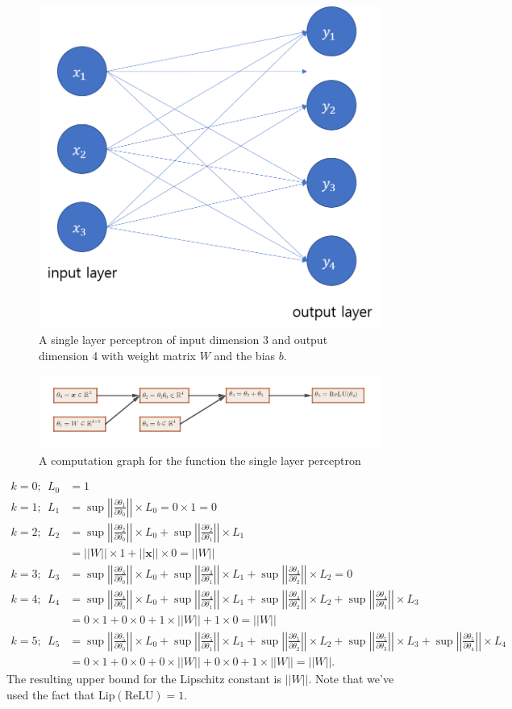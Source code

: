 \documentclass[12pt]{report}
\numberwithin{figure}{chapter}
\theoremstyle{plain}
\theoremstyle{definition}
\theoremstyle{corollary}
\theoremstyle{definition}
\theoremstyle{plain}
\theoremstyle{definition}
\theoremstyle{plain}
\newcommand\bx{\ensuremath{\boldsymbol x}}
\newcommand\lip{\ensuremath{\text{Lip}}}
\newcommand\norm[1]{\ensuremath{\left|\left|#1\right|\right|}}
\begin{document}
\begin{figure}[h]
\centering
\includegraphics[width=.4\textwidth]{SLP}
\caption{A single layer perceptron of input dimension 3 and output dimension 4 with weight matrix \(W\) and the bias \(b\).}
\label{SLP}
\end{figure}

\begin{figure}[h]
\centering
\includegraphics[width=\textwidth]{computation_graph_2}
\caption{A computation graph for the function the single layer perceptron}
\label{computation_graph_2}
\end{figure}

\begin{align*}
k=0;\:\: L_0&=1\\
k=1;\:\: L_1&=\sup\norm{\frac{\partial\theta_1}{\partial\theta_0}}\times L_0=0\times1=0\\
k=2;\:\: L_2&
=\sup\norm{\frac{\partial\theta_2}{\partial\theta_0}}\times L_0
+\sup\norm{\frac{\partial\theta_2}{\partial\theta_1}}\times L_1\\
&=||W||\times1+||\bx||\times0=||W||\\
k=3;\:\: L_3&
=\sup\norm{\frac{\partial\theta_3}{\partial\theta_0}}\times L_0
+\sup\norm{\frac{\partial\theta_3}{\partial\theta_1}}\times L_1
+\sup\norm{\frac{\partial\theta_3}{\partial\theta_2}}\times L_2=0\\
k=4;\:\: L_4&
=\sup\norm{\frac{\partial\theta_4}{\partial\theta_0}}\times L_0
+\sup\norm{\frac{\partial\theta_4}{\partial\theta_1}}\times L_1
+\sup\norm{\frac{\partial\theta_4}{\partial\theta_2}}\times L_2
+\sup\norm{\frac{\partial\theta_4}{\partial\theta_3}}\times L_3\\
&=0\times1+0\times0+1\times||W||+1\times0=||W||\\
k=5;\:\: L_5&
=\sup\norm{\frac{\partial\theta_5}{\partial\theta_0}}\times L_0
+\sup\norm{\frac{\partial\theta_5}{\partial\theta_1}}\times L_1
+\sup\norm{\frac{\partial\theta_5}{\partial\theta_2}}\times L_2
+\sup\norm{\frac{\partial\theta_5}{\partial\theta_3}}\times L_3
+\sup\norm{\frac{\partial\theta_5}{\partial\theta_4}}\times L_4\\
&=0\times1+0\times0+0\times||W||+0\times0+1\times||W||=||W||.
\end{align*}
The resulting upper bound for the Lipschitz constant is \(||W||\).
Note that we've used the fact that \(\lip(\text{ReLU})=1\).
\end{document}
